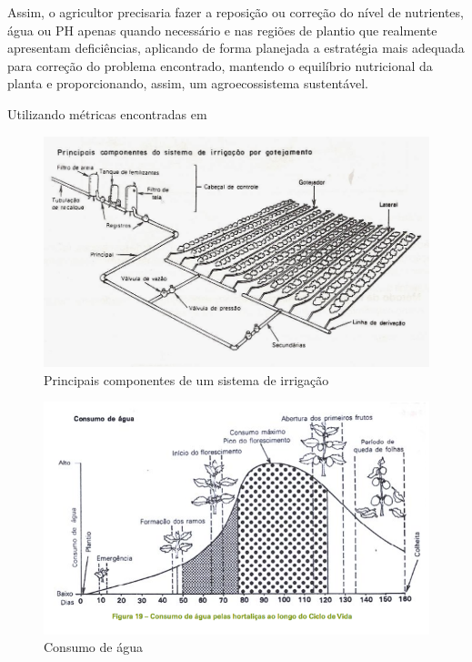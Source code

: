 Assim, o agricultor precisaria fazer a reposição ou correção do nível de nutrientes, água ou PH apenas quando necessário e nas regiões de plantio que realmente apresentam deficiências, aplicando de forma planejada a estratégia mais adequada para correção do problema encontrado, mantendo o equilíbrio nutricional da planta e proporcionando, assim, um agroecossistema sustentável.


Utilizando métricas encontradas em \cite{}

\begin{figure}[!htb]
	\centering
	\includegraphics[width=1.0\textwidth]{../images/irrigacao.png}
	\caption{Principais componentes de um sistema de irrigação}
	\label{fig:irrigacao}
\end{figure}

\begin{figure}[!htb]
	\centering
	\includegraphics[width=1.0\textwidth]{../images/consumo_de_agua.png}
	\caption{Consumo de água}
	\label{fig:consumoagua}
\end{figure}

